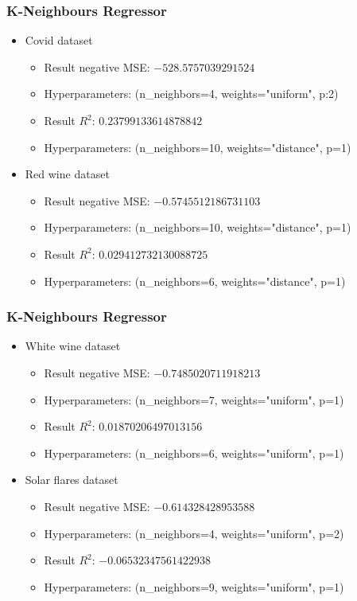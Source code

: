 \documentclass{beamer}
\begin{document}
\frame
{
  \frametitle{K-Neighbours Regressor}

  \begin{itemize}
    \item Covid dataset
    \begin{itemize}
      \item Result negative MSE: $-528.5757039291524$
      \item Hyperparameters: (n\_neighbors=4, weights="uniform", p:2)
      \item Result $R^{2}$: $0.23799133614878842$
      \item Hyperparameters: (n\_neighbors=10, weights="distance", p=1)
    \end{itemize}
    \item Red wine dataset
    \begin{itemize}
      \item Result negative MSE: $-0.5745512186731103$
      \item Hyperparameters: (n\_neighbors=10, weights="distance", p=1)
      \item Result $R^{2}$: $0.029412732130088725$
      \item Hyperparameters: (n\_neighbors=6, weights="distance", p=1)
    \end{itemize}
  \end{itemize}
}

\frame
{
  \frametitle{K-Neighbours Regressor}

  \begin{itemize}
    \item White wine dataset
    \begin{itemize}
      \item Result negative MSE: $-0.7485020711918213$
      \item Hyperparameters: (n\_neighbors=7, weights="uniform", p=1)
      \item Result $R^{2}$: $0.01870206497013156$
      \item Hyperparameters: (n\_neighbors=6, weights="uniform", p=1)
    \end{itemize}
    \item Solar flares dataset
    \begin{itemize}
      \item Result negative MSE: $-0.614328428953588$
      \item Hyperparameters: (n\_neighbors=4, weights="uniform", p=2)
      \item Result $R^{2}$: $-0.06532347561422938$
      \item Hyperparameters: (n\_neighbors=9, weights="uniform", p=1)
    \end{itemize}
  \end{itemize}
}
\end{document}
